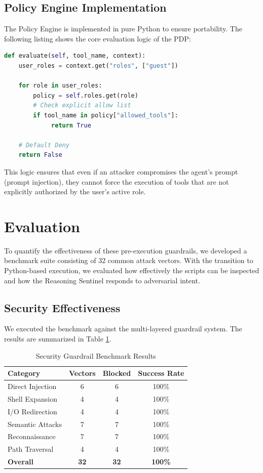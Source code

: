 \documentclass[conference]{IEEEtran}
\begin{document}
\subsection{Policy Engine Implementation}
The Policy Engine is implemented in pure Python to ensure portability. The following listing shows the core evaluation logic of the PDP:

\begin{lstlisting}[language=Python, caption=Core PDP Logic in policy.py]
def evaluate(self, tool_name, context):
    user_roles = context.get("roles", ["guest"])
    
    for role in user_roles:
        policy = self.roles.get(role)
        # Check explicit allow list
        if tool_name in policy["allowed_tools"]:
             return True
             
    # Default Deny
    return False
\end{lstlisting}

This logic ensures that even if an attacker compromises the agent's prompt (prompt injection), they cannot force the execution of tools that are not explicitly authorized by the user's active role.

\section{Evaluation}

To quantify the effectiveness of these pre-execution guardrails, we developed a benchmark suite consisting of 32 common attack vectors. With the transition to Python-based execution, we evaluated how effectively the scripts can be inspected and how the Reasoning Sentinel responds to adversarial intent.

\subsection{Security Effectiveness}
We executed the benchmark against the multi-layered guardrail system. The results are summarized in Table \ref{tab:security_results}.

\begin{table}[htbp]
\caption{Security Guardrail Benchmark Results}
\begin{center}
\begin{tabular}{|l|c|c|c|}
\hline
\textbf{Category} & \textbf{Vectors} & \textbf{Blocked} & \textbf{Success Rate} \\
\hline
Direct Injection & 6 & 6 & 100\% \\
Shell Expansion & 4 & 4 & 100\% \\
I/O Redirection & 4 & 4 & 100\% \\
Semantic Attacks & 7 & 7 & 100\% \\
Reconnaissance & 7 & 7 & 100\% \\
Path Traversal & 4 & 4 & 100\% \\
\hline
\textbf{Overall} & \textbf{32} & \textbf{32} & \textbf{100\%} \\
\hline
\end{tabular}
\label{tab:security_results}
\end{center}
\end{table}
\end{document}
